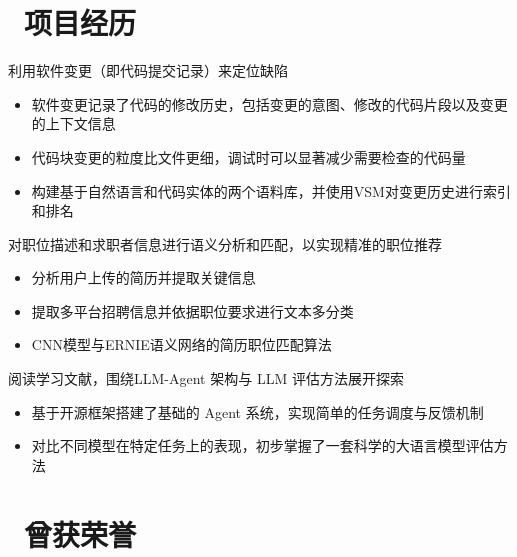 \documentclass{../../styles/resume}
\begin{document}
\section{\faUsers\ 项目经历}
\begin{onehalfspacing}
利用软件变更（即代码提交记录）来定位缺陷
\begin{itemize}
  \item 软件变更记录了代码的修改历史，包括变更的意图、修改的代码片段以及变更的上下文信息
  \item 代码块变更的粒度比文件更细，调试时可以显著减少需要检查的代码量
  \item 构建基于自然语言和代码实体的两个语料库，并使用VSM对变更历史进行索引和排名
\end{itemize}
\end{onehalfspacing}
\begin{onehalfspacing}%
对职位描述和求职者信息进行语义分析和匹配，以实现精准的职位推荐
\begin{itemize}%
\item 分析用户上传的简历并提取关键信息
\item 提取多平台招聘信息并依据职位要求进行文本多分类
\item CNN模型与ERNIE语义网络的简历职位匹配算法
\end{itemize}
\end{onehalfspacing}



\begin{onehalfspacing}
阅读学习文献，围绕LLM-Agent 架构与 LLM 评估方法展开探索
\begin{itemize}
  \item 基于开源框架搭建了基础的 Agent 系统，实现简单的任务调度与反馈机制
  \item 对比不同模型在特定任务上的表现，初步掌握了一套科学的大语言模型评估方法
\end{itemize}
\end{onehalfspacing}


\section{\faHeartO\ 曾获荣誉}
\end{document}
